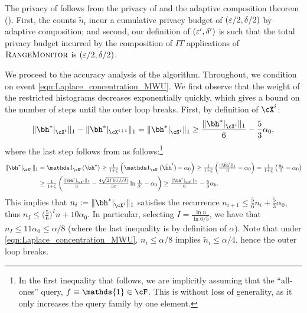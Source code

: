 \begin{proofof}{}
The privacy of  follows from the privacy of  and the adaptive composition theorem (). 
First, the counts $\tilde n_i$ incur a cumulative privacy budget of $(\varepsilon/2,\delta/2)$ by adaptive composition; and second, our definition of $(\varepsilon',\delta')$ is such that the total privacy budget incurred by the composition of $IT$ applications of $\textsc{RangeMonitor}$ is  $(\varepsilon/2,\delta/2)$. 

We proceed to the accuracy analysis of the algorithm. Throughout, we condition on event \eqref{eqn:Laplace_concentration_MWU}. 
We first observe that  the weight of the restricted histograms  decreases exponentially quickly, which gives a bound on the number of steps until the outer loop breaks. First, by definition of $\cX^i$:
\begin{align*} 
\|\bh^{\ast}|_{\cX^i}\|_1-\|\bh^{\ast}|_{\cX^{i+1}}\|_1 =\|\bh^{\ast}|_{\cS^i}\|_1
\geq \frac{\|\bh^{\ast}|_{\cX^i}\|_1}{6}-\frac53\alpha_0,
\end{align*}
where the last step follows from  as follows:\footnote{In the first inequality that follows, we are implicitly assuming that the ``all-ones'' query, $f\equiv \mathds{1}\in\cF$. This is without loss of generality, as it only increases the query family by one element.}
\begin{align*}
\textstyle \|\bh^{\ast}|_{\cS^i}\|_1 
&\textstyle = \ind_{\cS^i}(\bh^{\ast})   
\geq \frac{1}{1+\zeta}\left( \ind_{\cS^i}(\hbh^{i}) -\alpha_0 \right)
\geq 
\frac{1}{1+\zeta}\left(\frac{ \|\hbh^{i}\|_1 }{3} -\alpha_0\right) 
 =  \frac{1}{1+\zeta}\left(\frac{ \tilde n_i }{3} -\alpha_0\right) \\
&\textstyle \geq  \frac{1}{1+\zeta}\left(\frac{ \|\bh^{\ast}|_{\cX^i}\|_1 }{3} -\frac{4\sqrt{2I\ln(I/\delta)}}{3\eps}\ln \frac{1}{\beta'}-\alpha_0\right) 
\geq \frac{\|\bh^{\ast}|_{\cX^i}\|_1}{6}-\frac{5}{3}\alpha_0.
\end{align*}
This implies that $n_i:=\|\bh^{\ast}|_{\cX^i}\|_1$ satisfies the recurrence $n_{i+1} \leq \frac56 n_i+\frac53\alpha_0$, thus
$n_I \leq \big(\frac56\big)^In+10\alpha_0.$ 
In particular, selecting $I=\frac{\ln n}{\ln 6/5}$, we have that $n_I\leq 11\alpha_0\leq \alpha/8$ (where the last inequality is by definition of $\alpha$). Note that under \eqref{eqn:Laplace_concentration_MWU}, $n_i\leq \alpha/8$ implies $\tilde n_i\leq \alpha/4$, hence the outer loop breaks.





\end{proofof}
